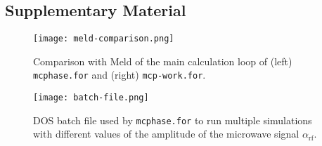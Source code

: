 \begin{supplement}


\section{Supplementary Material}


\begin{figure}[h]
    \centering
    \texttt{[image: meld-comparison.png]}
    \caption{Comparison with Meld of the main calculation loop of (left) \texttt{mcphase.for} and (right) \texttt{mcp-work.for}.}
    \label{fig:meld-comparison}
\end{figure}

\begin{figure}[p]
    \centering
    \texttt{[image: batch-file.png]}
    \caption{DOS batch file used by \texttt{mcphase.for} to run multiple simulations with different values of the amplitude of the microwave signal $\alpha_\mathrm{rf}$.}
    \label{fig:batch-file}
\end{figure}




\begin{figure}[p]
\centering


\end{figure}
\end{supplement}
